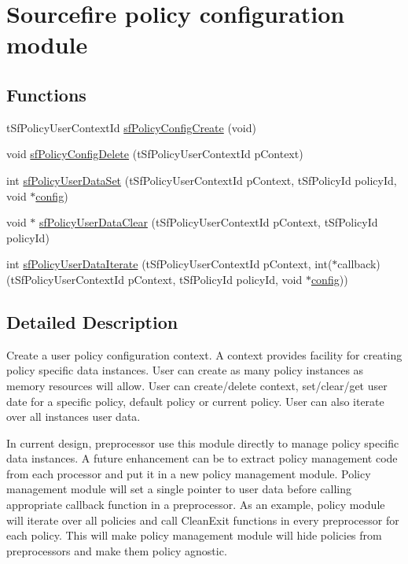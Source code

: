 \hypertarget{group__sfPolicyConfig}{
\section{Sourcefire policy configuration module}
\label{group__sfPolicyConfig}
}
\subsection*{Functions}
\begin{DoxyCompactItemize}
\item 
tSfPolicyUserContextId \hyperlink{group__sfPolicyConfig_gac62cd5838bee4a9d3f40561eae920cdd}{sfPolicyConfigCreate} (void)
\item 
void \hyperlink{group__sfPolicyConfig_ga189d09ed6d1203ebace6ea2c2aafc1b8}{sfPolicyConfigDelete} (tSfPolicyUserContextId pContext)
\item 
int \hyperlink{group__sfPolicyConfig_ga8e14fd83397b9bbb14568070183db80b}{sfPolicyUserDataSet} (tSfPolicyUserContextId pContext, tSfPolicyId policyId, void $\ast$\hyperlink{group__mysql_ga6439d32dccbbc77c9b2aad04897bfa74}{config})
\item 
void $\ast$ \hyperlink{group__sfPolicyConfig_gae8f2ae426b1f1a50eabfade6d22c2c85}{sfPolicyUserDataClear} (tSfPolicyUserContextId pContext, tSfPolicyId policyId)
\item 
int \hyperlink{group__sfPolicyConfig_ga3f3ab9314d29d2ee2a8285289b388f17}{sfPolicyUserDataIterate} (tSfPolicyUserContextId pContext, int($\ast$callback)(tSfPolicyUserContextId pContext, tSfPolicyId policyId, void $\ast$\hyperlink{group__mysql_ga6439d32dccbbc77c9b2aad04897bfa74}{config}))
\end{DoxyCompactItemize}


\subsection{Detailed Description}
Create a user policy configuration context. A context provides facility for creating policy specific data instances. User can create as many policy instances as memory resources will allow. User can create/delete context, set/clear/get user date for a specific policy, default policy or current policy. User can also iterate over all instances user data.

In current design, preprocessor use this module directly to manage policy specific data instances. A future enhancement can be to extract policy management code from each processor and put it in a new policy management module. Policy management module will set a single pointer to user data before calling appropriate callback function in a preprocessor. As an example, policy module will iterate over all policies and call CleanExit functions in every preprocessor for each policy. This will make policy management module will hide policies from preprocessors and make them policy agnostic. 

